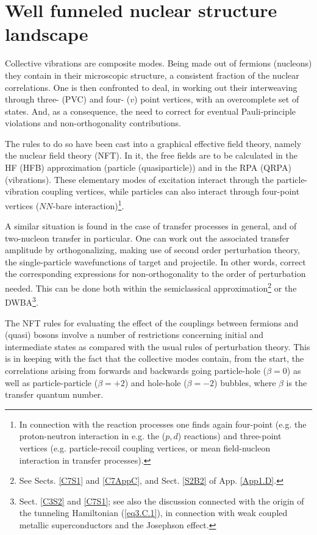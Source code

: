 \section{Well funneled nuclear structure landscape}\label{C1S4}
Collective vibrations are composite modes. Being made out of fermions (nucleons) they contain in their microscopic structure, a consistent fraction of the nuclear correlations. One is  then confronted to deal, in working out their interweaving through three- (PVC) and four- ($v$) point vertices, with an overcomplete set of states. And, as a consequence, the need to correct for eventual Pauli-principle violations and non-orthogonality contributions.

 The rules to do so have been cast into a graphical effective field theory, namely the nuclear field theory (NFT). In it, the free fields are to be calculated in the HF (HFB) approximation (particle (quasiparticle)) and in the RPA (QRPA) (vibrations). These elementary modes of excitation interact through the particle-vibration coupling vertices, while particles can also interact through four-point vertices ($NN$-bare interaction)\footnote{In connection with the reaction processes one finds again four-point  (e.g. the proton-neutron interaction in e.g. the ($p,d$) reactions) and three-point vertices (e.g. particle-recoil coupling vertices, or mean field-nucleon interaction in transfer processes).}.

A similar situation is found in the case of transfer processes in general, and of two-nucleon transfer in particular. One can work out the associated transfer amplitude by orthogonalizing, making use of second order perturbation theory, the single-particle wavefunctions of target and projectile. In other words, correct the corresponding expressions for non-orthogonality to the order of perturbation needed. This can be done both within the semiclassical approximation\footnote{See Sects. \ref{C7S1} and \ref{C7AppC}, and  Sect. \ref{S2B2} of App. \ref{App1.D}.}  or the  DWBA\footnote{Sect. \ref{C3S2} and \ref{C7S1}; see also the discussion connected with the origin of the tunneling Hamiltonian (\ref{eq3.C.1}), in connection with weak coupled metallic superconductors and  the Josephson effect.}. 

The NFT rules  for evaluating the effect of the couplings between fermions and (quasi) bosons involve a number of restrictions concerning initial and intermediate states as compared with the usual rules of perturbation theory. This is in keeping with the fact that the collective modes contain, from the start,  the correlations arising from forwards and backwards going  particle-hole ($\beta=0$) as well as particle-particle ($\beta=+2$) and hole-hole ($\beta=-2$) bubbles, where $\beta$ is the transfer quantum number. 
 

